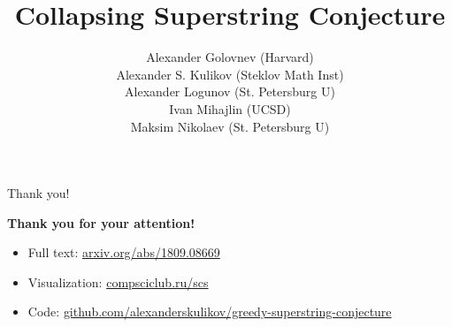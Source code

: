 \documentclass[14pt,xcolor=dvipsnames]{beamer}
\title{Collapsing Superstring Conjecture}
\date{}%
\author{Alexander Golovnev (Harvard)\\ Alexander S. Kulikov (Steklov Math Inst)\\ Alexander Logunov (St. Petersburg U)\\ Ivan Mihajlin (UCSD)\\ Maksim Nikolaev (St. Petersburg U)\\}
\begin{document}
\maketitle











\begin{frame}{Thank you!}
\vfill
\centerline{\alert{\bf \large Thank you for your attention!}}
\vfill
\begin{itemize}
\item \alert{Full text:} \url{arxiv.org/abs/1809.08669}
\item \alert{Visualization:} \url{compsciclub.ru/scs}
\item \alert{Code:} \url{github.com/alexanderskulikov/greedy-superstring-conjecture}
\end{itemize}
\vfill
\end{frame}
\end{document}
